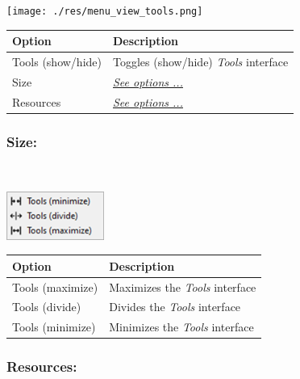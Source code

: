\texttt{[image: ./res/menu\_view\_tools.png]}\\

\begin{scriptsize}
  \begin{tabularx}{\textwidth}{>{\hsize=0.3\hsize}X>{\hsize=0.7\hsize}X}\\
    \hline
    \textbf{Option} & \textbf{Description} \\
    \hline
    Tools (show/hide) & Toggles (show/hide) \textit{Tools} interface \\
    \hdashline[1pt/1pt]
    Size & \textit{\href{\#menu\_view\_tools\_size}{See options ...}} \\
    \hdashline[1pt/1pt]
    Resources & \textit{\href{\#menu\_view\_tools\_resources}{See options ...}} \\
    \hline
  \end{tabularx}
\end{scriptsize}


\hypertarget{menu_view_tools_size}{}
\subsubsection{Size:}\\

\includegraphics[scale=0.8]{./res/menu_view_tools_size.png}\\

\begin{scriptsize}
  \begin{tabularx}{\textwidth}{>{\hsize=0.3\hsize}X>{\hsize=0.7\hsize}X}\\
    \hline
    \textbf{Option} & \textbf{Description} \\
    \hline
    Tools (maximize) & Maximizes the \textit{Tools} interface \\
    Tools (divide) & Divides the \textit{Tools} interface \\
    Tools (minimize) & Minimizes the \textit{Tools} interface \\
    \hline
  \end{tabularx}
\end{scriptsize}


\hypertarget{menu_view_tools_resources}{}
\subsubsection{Resources:}\\

